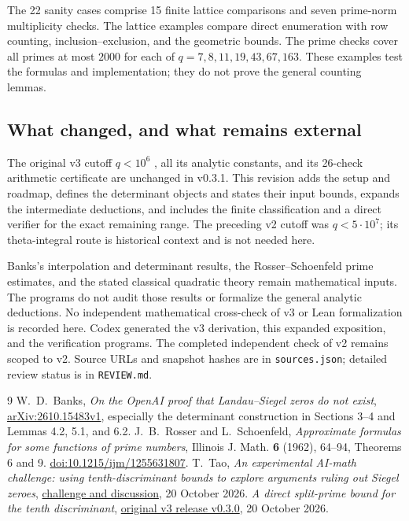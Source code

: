 \documentclass[11pt]{article}
\begin{document}
The 22 sanity cases comprise 15 finite lattice comparisons and seven
prime-norm multiplicity checks. The lattice examples compare direct
enumeration with row counting, inclusion--exclusion, and the geometric
bounds. The prime checks cover all primes at most \(2000\) for each
of \(q=7,8,11,19,43,67,163\). These examples test the formulas and
implementation; they do not prove the general counting lemmas.

\subsection{What changed, and what remains external}

The original v3 cutoff \(q<10^6\) \cite{v3}, all its analytic constants, and its
26-check arithmetic certificate are unchanged in v0.3.1. This revision
adds the setup and roadmap, defines the determinant objects and states
their input bounds, expands the intermediate deductions, and includes
the finite classification and a direct verifier for the exact remaining
range. The preceding v2 cutoff was \(q<5\cdot10^7\); its theta-integral
route is historical context and is not needed here.

Banks's interpolation and determinant results, the Rosser--Schoenfeld
prime estimates, and the stated classical quadratic theory remain
mathematical inputs. The programs do not audit those results or
formalize the general analytic deductions. No independent mathematical
cross-check of v3 or Lean formalization is recorded here.
Codex generated the v3 derivation, this expanded exposition, and the
verification programs. The completed independent check of v2 remains
scoped to v2. Source URLs and snapshot hashes are in
\texttt{sources.json}; detailed review status is in \texttt{REVIEW.md}.

\begin{thebibliography}{9}
W.~D.~Banks, \emph{On the OpenAI proof that Landau--Siegel zeros
do not exist}, \href{https://arxiv.org/abs/2610.15483v1}
{arXiv:2610.15483v1}, especially the determinant construction in
Sections 3--4 and Lemmas 4.2, 5.1, and 6.2.
J.~B.~Rosser and L.~Schoenfeld,
\emph{Approximate formulas for some functions of prime numbers},
Illinois J. Math. \textbf{6} (1962), 64--94, Theorems 6 and 9.
\href{https://doi.org/10.1215/ijm/1255631807}{doi:10.1215/ijm/1255631807}.
T.~Tao, \emph{An experimental AI-math challenge: using tenth-discriminant
bounds to explore arguments ruling out Siegel zeroes},
\href{https://terrytao.wordpress.com/2026/10/20/an-experimental-ai-math-challenge-using-tenth-discriminant-bounds-to-explore-arguments-ruling-out-siegel-zeroes/}
{challenge and discussion}, 20 October 2026.
\emph{A direct split-prime bound for the tenth discriminant},
\href{https://github.com/twinheterodox/tenth-discriminant/releases/tag/v0.3.0}
{original v3 release v0.3.0}, 20 October 2026.
\end{thebibliography}
\end{document}
